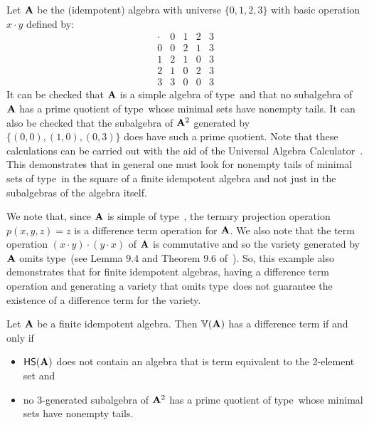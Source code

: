\begin{example}\label{alg:nodiff}
Let $\mathbf{A}$ be the (idempotent) algebra with universe $\{0,1,2, 3\}$ with basic operation $x\cdot y$ defined by:
  \[
  \begin{array}{c|cccc}
  \cdot&0&1&2&3\\\hline
  0&0&2&1&3\\
  1&2&1&0&3\\
  2&1&0&2&3\\
  3&3&0&0&3
  \end{array}
  \]
It can be checked that $\mathbf{A}$ is a simple algebra of type~\btyp and that no subalgebra of $\mathbf{A}$ has a prime quotient of type~\atyp whose minimal sets have nonempty tails.  It can also be checked that the subalgebra of $\mathbf{A}^2$ generated by $\{(0,0), (1,0), (0,3)\}$ does have such a prime quotient.
Note that these calculations can be carried out with the aid of the Universal Algebra Calculator~\cite{UACalc}.
This demonstrates that in general one must look for nonempty tails of minimal sets of type~\atyp in the square of a finite idempotent algebra and not just in the subalgebras of the algebra itself.

We note that, since $\mathbf{A}$ is simple of type~\btyp, the ternary projection operation $p(x,y,z ) = z$ is a difference term operation for $\mathbf{A}$.  We also note that the term operation $(x\cdot y) \cdot(y \cdot x)$ of $\mathbf{A}$ is commutative and so the variety generated by $\mathbf{A}$ omits type~\utyp (see Lemma 9.4 and Theorem 9.6 of~\cite{HM:1988}).  So, this example also demonstrates that for finite idempotent algebras, having a difference term operation and generating a variety that omits type~\utyp does not guarantee the existence of a difference term for the variety.
\end{example}

\begin{corollary}\label{cor:diffterm}
  Let $\mathbf{A}$ be a finite idempotent algebra.  Then $\operatorname{\mathbb{V}}(\mathbf{A})$ has a difference term if and only if
  \begin{itemize}
  \item $\mathsf{H} \mathsf{S} (\mathbf{A})$ does not contain an algebra that is term equivalent to the 2-element set and
      \item no 3-generated subalgebra of $\mathbf{A}^2$ has a prime quotient of type~\atyp whose minimal sets have nonempty tails.
  \end{itemize}
\end{corollary}


